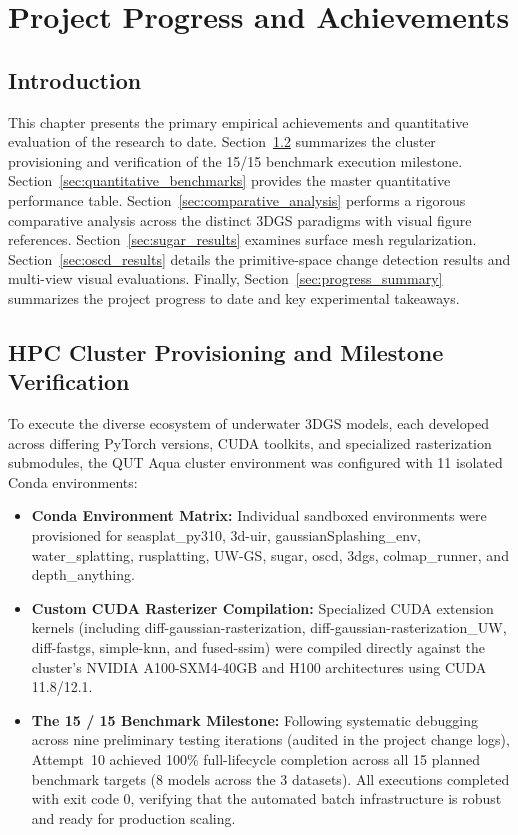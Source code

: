 
\chapter{Project Progress and Achievements}
\label{chap:progress}

\section{Introduction}
\label{sec:progress_intro}
This chapter presents the primary empirical achievements and quantitative evaluation of the research to date. Section~\ref{sec:milestone_verification} summarizes the cluster provisioning and verification of the 15/15 benchmark execution milestone. Section~\ref{sec:quantitative_benchmarks} provides the master quantitative performance table. Section~\ref{sec:comparative_analysis} performs a rigorous comparative analysis across the distinct 3DGS paradigms with visual figure references. Section~\ref{sec:sugar_results} examines surface mesh regularization. Section~\ref{sec:oscd_results} details the primitive-space change detection results and multi-view visual evaluations. Finally, Section~\ref{sec:progress_summary} summarizes the project progress to date and key experimental takeaways.

\section{HPC Cluster Provisioning and Milestone Verification}
\label{sec:milestone_verification}
To execute the diverse ecosystem of underwater 3DGS models, each developed across differing PyTorch versions, CUDA toolkits, and specialized rasterization submodules, the QUT Aqua cluster environment was configured with 11 isolated Conda environments:
\begin{itemize}
    \item \textbf{Conda Environment Matrix:} Individual sandboxed environments were provisioned for seasplat\_py310, 3d-uir, gaussianSplashing\_env, water\_splatting, rusplatting, UW-GS, sugar, oscd, 3dgs, colmap\_runner, and depth\_anything.
    \item \textbf{Custom CUDA Rasterizer Compilation:} Specialized CUDA extension kernels (including diff-gaussian-rasterization, diff-gaussian-rasterization\_UW, diff-fastgs, simple-knn, and fused-ssim) were compiled directly against the cluster's NVIDIA A100-SXM4-40GB and H100 architectures using CUDA 11.8/12.1.
    \item \textbf{The 15 / 15 Benchmark Milestone:} Following systematic debugging across nine preliminary testing iterations (audited in the project change logs), Attempt~10 achieved 100\% full-lifecycle completion across all 15 planned benchmark targets (8 models across the 3 datasets). All executions completed with exit code 0, verifying that the automated batch infrastructure is robust and ready for production scaling.
\end{itemize}

